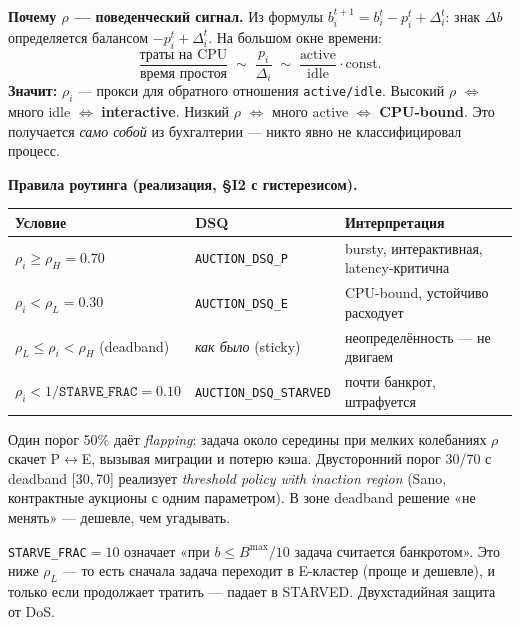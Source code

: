 \documentclass[11pt,a4paper]{article}
\begin{document}
\textbf{Почему $\rho$ — поведенческий сигнал.}
Из формулы $b_i^{t+1}=b_i^t-p_i^t+\Delta_i^t$: знак $\Delta b$
определяется балансом $-p_i^t + \Delta_i^t$. На большом окне
времени:
\[
\frac{\text{траты на CPU}}{\text{время простоя}} \;\sim\;
\frac{p_i}{\Delta_i} \;\sim\; \frac{\text{active}}{\text{idle}}\cdot\text{const}.
\]
\textbf{Значит:} $\rho_i$ — прокси для обратного отношения
\texttt{active/idle}. Высокий $\rho$ $\Leftrightarrow$ много idle $\Leftrightarrow$
\textbf{interactive}. Низкий $\rho$ $\Leftrightarrow$ много active $\Leftrightarrow$
\textbf{CPU-bound}. Это получается \emph{само собой} из
бухгалтерии — никто явно не классифицировал процесс.

\textbf{Правила роутинга (реализация, §I2 с гистерезисом).}
\begin{center}\small
\begin{tabular}{@{}lll@{}}
\toprule
Условие & DSQ & Интерпретация\\
\midrule
$\rho_i \geq \rho_H = 0.70$               & \texttt{AUCTION\_DSQ\_P}       & bursty, интерактивная, latency-критична\\
$\rho_i < \rho_L = 0.30$                  & \texttt{AUCTION\_DSQ\_E}       & CPU-bound, устойчиво расходует\\
$\rho_L \leq \rho_i < \rho_H$ (deadband)  & \emph{как было} (sticky)       & неопределённость — не двигаем\\
$\rho_i < 1/\mathtt{STARVE\_FRAC}=0.10$   & \texttt{AUCTION\_DSQ\_STARVED} & почти банкрот, штрафуется\\
\bottomrule
\end{tabular}
\end{center}

\begin{why}
Один порог 50\% даёт \emph{flapping}: задача около середины при
мелких колебаниях $\rho$ скачет P$\leftrightarrow$E, вызывая
миграции и потерю кэша. Двусторонний порог 30/70 с deadband
[30,\,70] реализует \emph{threshold policy with inaction
region} (Sano, контрактные аукционы с одним параметром). В зоне
deadband решение «не менять» — дешевле, чем угадывать.
\end{why}

\begin{why}
\texttt{STARVE\_FRAC}$=10$ означает «при $b\leq B^{\max}/10$ задача
считается банкротом». Это ниже $\rho_L$ — то есть сначала задача
переходит в E-кластер (проще и дешевле), и только если продолжает
тратить — падает в STARVED. Двухстадийная защита от DoS.
\end{why}
\end{document}
